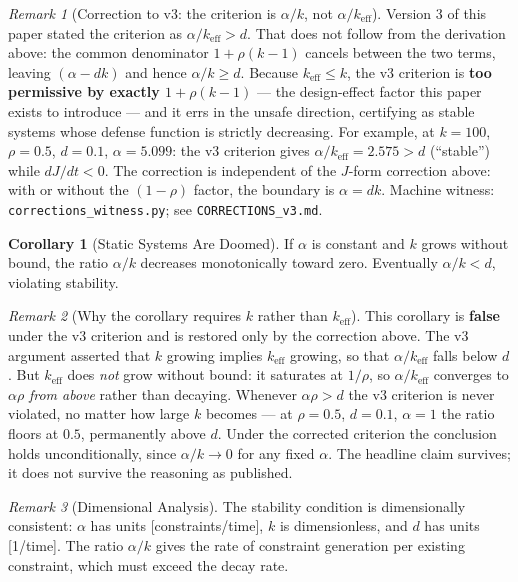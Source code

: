 \documentclass[11pt,a4paper]{article}
\theoremstyle{definition}
\newtheorem{corollary}[theorem]{Corollary}
\theoremstyle{remark}
\newtheorem{remark}{Remark}[section]
\newcommand{\keff}{k_{\text{eff}}}
\begin{document}
\begin{remark}[Correction to v3: the criterion is $\alpha/k$, not $\alpha/\keff$]
Version 3 of this paper stated the criterion as $\alpha/\keff > d$. That does not follow from the derivation above: the common denominator $1+\rho(k-1)$ cancels between the two terms, leaving $(\alpha - dk)$ and hence $\alpha/k \geq d$. Because $\keff \leq k$, the v3 criterion is \textbf{too permissive by exactly $1 + \rho(k-1)$} --- the design-effect factor this paper exists to introduce --- and it errs in the unsafe direction, certifying as stable systems whose defense function is strictly decreasing. For example, at $k=100$, $\rho=0.5$, $d=0.1$, $\alpha=5.099$: the v3 criterion gives $\alpha/\keff = 2.575 > d$ (``stable'') while $dJ/dt < 0$. The correction is independent of the $J$-form correction above: with or without the $(1-\rho)$ factor, the boundary is $\alpha = dk$. Machine witness: \texttt{corrections\_witness.py}; see \texttt{CORRECTIONS\_v3.md}.
\end{remark}

\begin{corollary}[Static Systems Are Doomed]
\label{cor:static}
If $\alpha$ is constant and $k$ grows without bound, the ratio $\alpha/k$ decreases monotonically toward zero. Eventually $\alpha/k < d$, violating stability.
\end{corollary}

\begin{remark}[Why the corollary requires $k$ rather than $\keff$]
This corollary is \textbf{false} under the v3 criterion and is restored only by the correction above. The v3 argument asserted that $k$ growing implies $\keff$ growing, so that $\alpha/\keff$ falls below $d$. But $\keff$ does \textit{not} grow without bound: it saturates at $1/\rho$, so $\alpha/\keff$ converges to $\alpha\rho$ \textit{from above} rather than decaying. Whenever $\alpha\rho > d$ the v3 criterion is never violated, no matter how large $k$ becomes --- at $\rho=0.5$, $d=0.1$, $\alpha=1$ the ratio floors at $0.5$, permanently above $d$. Under the corrected criterion the conclusion holds unconditionally, since $\alpha/k \to 0$ for any fixed $\alpha$. The headline claim survives; it does not survive the reasoning as published.
\end{remark}

\begin{remark}[Dimensional Analysis]
The stability condition is dimensionally consistent: $\alpha$ has units [constraints/time], $k$ is dimensionless, and $d$ has units [1/time]. The ratio $\alpha/k$ gives the rate of constraint generation per existing constraint, which must exceed the decay rate.
\end{remark}
\end{document}
